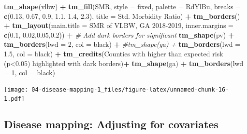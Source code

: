 \documentclass[
]{book}
\newenvironment{Shaded}{\begin{snugshade}}{\end{snugshade}}
\newcommand{\AttributeTok}[1]{\textcolor[rgb]{0.13,0.29,0.53}{#1}}
\newcommand{\CommentTok}[1]{\textcolor[rgb]{0.56,0.35,0.01}{\textit{#1}}}
\newcommand{\DecValTok}[1]{\textcolor[rgb]{0.00,0.00,0.81}{#1}}
\newcommand{\FloatTok}[1]{\textcolor[rgb]{0.00,0.00,0.81}{#1}}
\newcommand{\FunctionTok}[1]{\textcolor[rgb]{0.13,0.29,0.53}{\textbf{#1}}}
\newcommand{\NormalTok}[1]{#1}
\newcommand{\SpecialCharTok}[1]{\textcolor[rgb]{0.81,0.36,0.00}{\textbf{#1}}}
\newcommand{\StringTok}[1]{\textcolor[rgb]{0.31,0.60,0.02}{#1}}
\begin{document}
\begin{Shaded}
\begin{Highlighting}[]
\FunctionTok{tm\_shape}\NormalTok{(vlbw) }\SpecialCharTok{+}
  \FunctionTok{tm\_fill}\NormalTok{(}\StringTok{\textquotesingle{}SMR\textquotesingle{}}\NormalTok{,}
          \AttributeTok{style =} \StringTok{\textquotesingle{}fixed\textquotesingle{}}\NormalTok{,}
          \AttributeTok{palette =} \StringTok{\textquotesingle{}{-}RdYlBu\textquotesingle{}}\NormalTok{,}
          \AttributeTok{breaks =} \FunctionTok{c}\NormalTok{(}\FloatTok{0.13}\NormalTok{, }\FloatTok{0.67}\NormalTok{, }\FloatTok{0.9}\NormalTok{, }\FloatTok{1.1}\NormalTok{, }\FloatTok{1.4}\NormalTok{, }\FloatTok{2.3}\NormalTok{),}
          \AttributeTok{title =} \StringTok{\textquotesingle{}Std. Morbidity Ratio\textquotesingle{}}\NormalTok{) }\SpecialCharTok{+} 
  \FunctionTok{tm\_borders}\NormalTok{() }\SpecialCharTok{+}
  \FunctionTok{tm\_layout}\NormalTok{(}\AttributeTok{main.title =} \StringTok{\textquotesingle{}SMR of VLBW, GA 2018{-}2019\textquotesingle{}}\NormalTok{,}
            \AttributeTok{inner.margins =} \FunctionTok{c}\NormalTok{(}\FloatTok{0.1}\NormalTok{, }\FloatTok{0.02}\NormalTok{,}\FloatTok{0.05}\NormalTok{,}\FloatTok{0.2}\NormalTok{)) }\SpecialCharTok{+}
  \CommentTok{\# Add dark borders for significant}
  \FunctionTok{tm\_shape}\NormalTok{(pv) }\SpecialCharTok{+}
  \FunctionTok{tm\_borders}\NormalTok{(}\AttributeTok{lwd =} \DecValTok{2}\NormalTok{, }\AttributeTok{col =} \StringTok{\textquotesingle{}black\textquotesingle{}}\NormalTok{) }\SpecialCharTok{+}
  \CommentTok{\#tm\_shape(ga) + }
  \FunctionTok{tm\_borders}\NormalTok{(}\AttributeTok{lwd =} \FloatTok{1.5}\NormalTok{, }\AttributeTok{col =} \StringTok{\textquotesingle{}black\textquotesingle{}}\NormalTok{) }\SpecialCharTok{+}
  \FunctionTok{tm\_credits}\NormalTok{(}\StringTok{\textquotesingle{}Counties with higher than expected risk (p\textless{}0.05) highlighted with dark borders\textquotesingle{}}\NormalTok{)}\SpecialCharTok{+}
  \FunctionTok{tm\_shape}\NormalTok{(ga) }\SpecialCharTok{+}
  \FunctionTok{tm\_borders}\NormalTok{(}\AttributeTok{lwd =} \DecValTok{1}\NormalTok{, }\AttributeTok{col =} \StringTok{\textquotesingle{}black\textquotesingle{}}\NormalTok{)}
\end{Highlighting}
\end{Shaded}

\texttt{[image: 04-disease-mapping-1\_files/figure-latex/unnamed-chunk-16-1.pdf]}

\hypertarget{disease-mapping-adjusting-for-covariates}{%
\subsection{Disease mapping: Adjusting for covariates}\label{disease-mapping-adjusting-for-covariates}}
\end{document}
